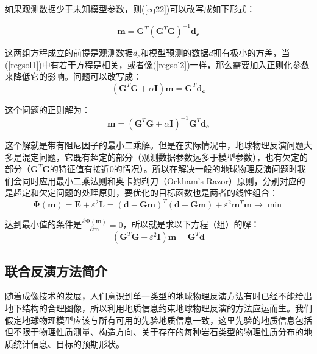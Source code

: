 如果观测数据少于未知模型参数，则(\ref{eq22})可以改写成如下形式：

\begin{equation}
    \mathbf{m}=\mathbf{G}^T(\mathbf{G}^T\mathbf{G})^{-1}\mathbf{d_c}
    \label{regsol2}
\end{equation}

这两组方程成立的前提是观测数据$d_c$和模型预测的数据$d$拥有极小的方差，当(\ref{regsol1})中有若干方程是相关，或者像(\ref{regsol2})一样，那么需要加入正则化参数来降低它的影响。问题可以改写成：
\begin{equation}
    (\mathbf{G}^T\mathbf{G}+\alpha \mathbf{I})\mathbf{m}=\mathbf{G}^T\mathbf{d_c}
    \label{eq25}
\end{equation}

这个问题的正则解为： 
\begin{equation}
    \mathbf{m}=(\mathbf{G}^T\mathbf{G}+\alpha \mathbf{I})^{-1}\mathbf{G}^T\mathbf{d_c}
    \label{eq26}
\end{equation}

这个解就是带有阻尼因子的最小二乘解。但是在实际情况中，地球物理反演问题大多是混定问题，它既有超定的部分（观测数据参数远多于模型参数），也有欠定的部分（$\mathbf{G}^T\mathbf{G}$的特征值有接近0的情况）。所以在解决一般的地球物理反演问题时我们会同时应用最小二乘法则和奥卡姆剃刀（Ockham's Razor）原则，分别对应的是超定和欠定问题的处理原则，要优化的目标函数也是两者的线性组合：
\begin{equation}
    \mathbf{\Phi}(\mathbf{m})=\mathbf{E}+\varepsilon^2\mathbf{L}=(\mathbf{d-Gm})^T(\mathbf{d-Gm})+\varepsilon^2\mathbf{m}^T\mathbf{m}\to\min
    \label{eq27}
\end{equation}

达到最小值的条件是$\frac{\partial \mathbf{\Phi}(\mathbf{m})}{\partial\mathbf{m}}=0$，所以就是求以下方程（组）的解：
\begin{equation}
    (\mathbf{G}^T\mathbf{G}+\varepsilon^2\mathbf{I})\mathbf{m}=\mathbf{G}^T\mathbf{d}
    \label{eq28}
\end{equation}

\subsection{联合反演方法简介}

随着成像技术的发展，人们意识到单一类型的地球物理反演方法有时已经不能给出地下结构的合理图像，所以利用地质信息约束地球物理反演的方法应运而生。我们假定地球物理模型应该与所有可用的先验地质信息一致，这里先验的地质信息包括但不限于物理性质测量、构造方向、关于存在的每种岩石类型的物理性质分布的地质统计信息、目标的预期形状。

